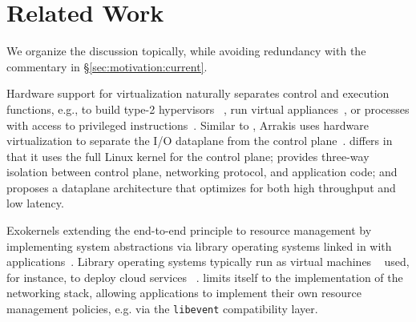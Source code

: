 

\section{Related Work}
\label{sec:related}

We organize the discussion topically, while avoiding redundancy with
the commentary in \S\ref{sec:motivation:current}.

 Hardware support for
virtualization naturally separates control and execution functions,
e.g., to build type-2 hypervisors
~\cite{DBLP:journals/tocs/BugnionDRSW12,misc/kivity07kvm}, run virtual
appliances~\cite{DBLP:conf/lisa/SapuntzakisBCZCLR03}, or processes
with access to privileged instructions~\cite{dune}. Similar to \ix,
Arrakis uses hardware virtualization to separate the I/O dataplane
from the control plane~\cite{arrakis-osdi}. \ix differs in that it
uses the full Linux kernel for the control plane; provides three-way
isolation between control plane, networking protocol, and application
code; and proposes a dataplane architecture that optimizes for both
high throughput and low latency. 

 Exokernels extending the
end-to-end principle to resource management by implementing system
abstractions via library operating systems linked in with
applications~\cite{DBLP:conf/sosp/EnglerKO95}.  Library operating
systems typically run as virtual machines
~\cite{DBLP:journals/tocs/BugnionDGR97} used, for instance, to deploy
cloud services ~\cite{DBLP:conf/asplos/MadhavapeddyMRSSGSHC13}. \ix
limits itself to the implementation of the networking stack, allowing
applications to implement their own resource management policies,
e.g. via the \texttt{libevent} compatibility layer.

\begin{comment}
  \myparagraph{User-level networking stacks:} User-level network
  stacks~\cite{jeong2014mtcp, sandstorm, openonload} can outperform
  kernel-based implementations through specialization and elimination
  of redundant layers and abstractions, but trade-off performance for
  a weaker security model.  The \ix dataplane demonstrates that a
  specialized networking stack can offer performance and cooperate
  with applications without having to weaken security and isolation
  properties.
 
  \myparagraph{Hardware and protocol specialization:} Applications can
  use a connection-less UDP-based protocol for
  scalability~\cite{DBLP:conf/nsdi/NishtalaFGKLLMPPSSTV13}.
  Latency-sensitive datacenter applications can use specialized
  Infiniband adapters to expose RDMA with $1-3$\microsecond latencies
  to
  applications~\cite{dragojevic14farm,DBLP:conf/icpp/JoseSLZHWIOWSP11,
    mitchell:rdma, DBLP:conf/sosp/OngaroRSOR11}.  Specialized FGPAs
  can replace conventional servers for important applications such as
  memcached~\cite{DBLP:conf/hotcloud/BlottKLVBI13,DBLP:conf/fpga/ChalamalasettiLWARM13,HPHA:Tanaka:2014}.
  \ix is designed to allow TCP/IP to scale with architectural trends
  by eliminating kernel bottlenecks.
\end{comment}


